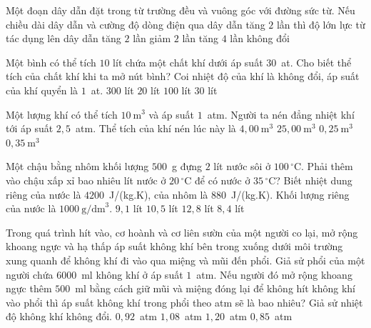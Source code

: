 	\begin{ex}%
		Một đoạn dây dẫn đặt trong từ trường đều và vuông góc với đường sức từ. Nếu chiều dài dây dẫn và cường độ dòng điện qua dây dẫn tăng $2$ lần thì độ lớn lực từ tác dụng lên dây dẫn
		\choice
		{tăng $2$ lần}
		{giảm $2$ lần}
		{\True tăng $4$ lần}
		{không đổi}
	\end{ex}

	\begin{ex}%
		Một bình có thể tích $10$ lít chứa một chất khí dưới áp suất $30$~at. Cho biết thể tích của chất khí khi ta mở nút bình? Coi nhiệt độ của khí là không đổi, áp suất của khí quyển là $1$~at.
		\choice
		{\True $300$ lít}
		{$20$ lít}
		{$100$ lít}
		{$30$ lít}
	\end{ex}

	\begin{ex}%
		Một lượng khí có thể tích $10~\text{m}^3$ và áp suất $1$~atm. Người ta nén đẳng nhiệt khí tới áp suất $2{,}5$~atm. Thể tích của khí nén lúc này là
		\choice
		{\True $4{,}00~\text{m}^3$}
		{$25{,}00~\text{m}^3$}
		{$0{,}25~\text{m}^3$}
		{$0{,}35~\text{m}^3$}
	\end{ex}

	\begin{ex}%
		Một chậu bằng nhôm khối lượng $500$~g đựng $2$ lít nước sôi ở $100\,^\circ\text{C}$. Phải thêm vào chậu xấp xỉ bao nhiêu lít nước ở $20\,^\circ\text{C}$ để có nước ở $35\,^\circ\text{C}$? Biết nhiệt dung riêng của nước là $4200$~J/(kg.K), của nhôm là $880$~J/(kg.K). Khối lượng riêng của nước là $1000~\text{g/dm}^3$.
		\choice
		{\True $9{,}1$ lít}
		{$10{,}5$ lít}
		{$12{,}8$ lít}
		{$8{,}4$ lít}
	\end{ex}

	\begin{ex}%
		Trong quá trình hít vào, cơ hoành và cơ liên sườn của một người co lại, mở rộng khoang ngực và hạ thấp áp suất không khí bên trong xuống dưới môi trường xung quanh để không khí đi vào qua miệng và mũi đến phổi. Giả sử phổi của một người chứa $6000$~ml không khí ở áp suất $1$~atm. Nếu người đó mở rộng khoang ngực thêm $500$~ml bằng cách giữ mũi và miệng đóng lại để không hít không khí vào phổi thì áp suất không khí trong phổi theo atm sẽ là bao nhiêu? Giả sử nhiệt độ không khí không đổi.
		\choice
		{\True $0{,}92$~atm}
		{$1{,}08$~atm}
		{$1{,}20$~atm}
		{$0{,}85$~atm}
	\end{ex}

